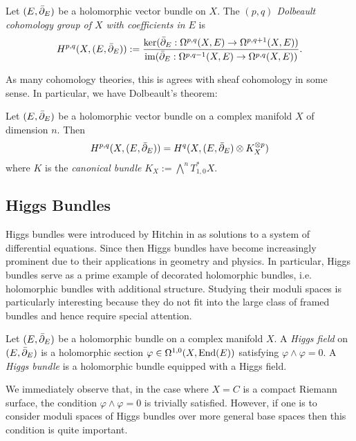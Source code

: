 \documentclass[12pt]{ociamthesis}  %
\begin{document}
\begin{definition}
  Let $(E,{\bar{\partial}}_E)$ be a holomorphic vector bundle on $X$. The
  \emph{$(p,q)$ Dolbeault cohomology group of $X$ with coefficients in
    $E$} is
  \begin{align*}
    H^{p,q}(X,(E,{\bar{\partial}}_E)) := \frac{
      \ker({\bar{\partial}}_E : \Omega^{p,q}(X,E) \to \Omega^{p,q+1}(X,E))
    }{
      \operatorname{im}({\bar{\partial}}_E : \Omega^{p,q-1}(X,E) \to \Omega^{p,q}(X,E))
    }.
  \end{align*}
\end{definition}

As many cohomology theories, this is agrees with sheaf cohomology
in some sense. In particular, we have Dolbeault's theorem:

\begin{theorem}[Dolbeault]\label{thm:dolbeault}
  Let $(E,{\bar{\partial}}_E)$ be a holomorphic vector bundle on a complex manifold
  $X$ of dimension $n$. Then
  \begin{align*}
    H^{p,q}(X,(E,{\bar{\partial}}_E)) = H^q(X,(E,{\bar{\partial}}_E)\otimes K^{\otimes p}_X)
  \end{align*}
  where $K$ is the \emph{canonical bundle}
  $K_X := \bigwedge^n T_{1,0}^* X$.
\end{theorem}

\subsection{Higgs Bundles}

Higgs bundles were introduced by Hitchin in \cite{hitchin1987}
as solutions to a system of differential equations. Since then
Higgs bundles have become increasingly prominent due to their applications
in geometry and physics. In particular, Higgs bundles serve as a
prime example of decorated holomorphic bundles, i.e. holomorphic bundles
with additional structure. Studying their moduli spaces is particularly
interesting because they do not fit into the large class of framed
bundles and hence require special attention.
\cite[Example 4.B.3]{huybrechts2010}

\begin{definition}
  Let $(E,{\bar{\partial}}_E)$ be a holomorphic bundle on a complex manifold $X$.
  A \emph{Higgs field} on $(E,{\bar{\partial}}_E)$ is a holomorphic section
  $\varphi \in \Omega^{1,0}(X,\operatorname{End}(E))$ satisfying $\varphi\wedge\varphi = 0$.
  A \emph{Higgs bundle} is a holomorphic bundle equipped with
  a Higgs field.
\end{definition}
We immediately observe that, in the case where $X=C$ is a compact
Riemann surface, the condition $\varphi\wedge\varphi=0$ is trivially
satisfied. However, if one is to consider moduli spaces of Higgs bundles
over more general base spaces then this condition is quite important.
\end{document}
